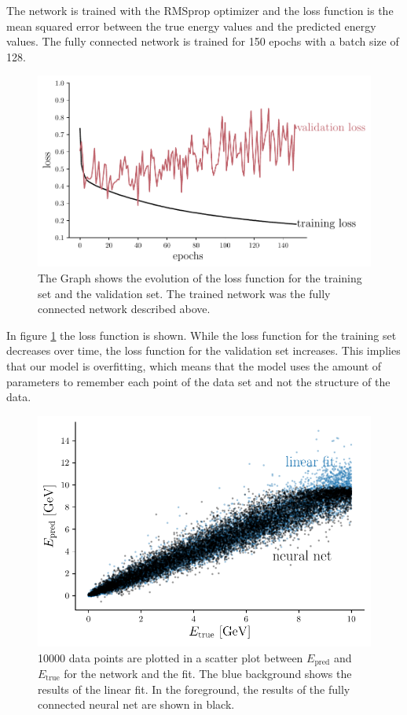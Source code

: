 \documentclass[12pt, a4paper]{thesis}
\begin{document}
The network is trained with the RMSprop optimizer and the loss
function is the mean squared error between the true energy values and
the predicted energy values. The fully connected network is trained
for 150 epochs with a batch size of 128.

\begin{figure}[H]
  \centering
  \includegraphics[width=.9\linewidth]{../images/dense_loss.pdf}
  \caption{The Graph shows the evolution of the loss function for the
    training set and the validation set. The trained network was the
    fully connected network described above.}
  \label{dense_loss}
\end{figure}


In figure \ref{dense_loss} the loss function is shown. While the loss
function for the training set decreases over time, the loss function
for the validation set increases. This implies that our model is
overfitting, which means that the model uses the amount of parameters
to remember each point of the data set and not the structure of the
data.

\begin{figure}[H]
  \centering
  \includegraphics[width=.9\linewidth]{../images/dense_scatter.pdf}
  \caption{ 10000 data points are plotted in a scatter plot between
    \(E_\text{pred}\) and \(E_{\text{true}}\) for the network and the fit. The blue
    background shows the results of the linear fit. In the foreground,
    the results of the fully connected neural net are shown in black.}
  \label{dense_scatter}
\end{figure} 
\end{document}
